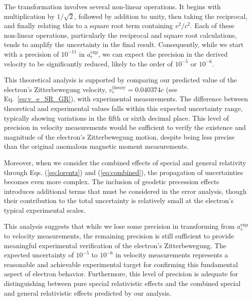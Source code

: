 \documentclass[%
 reprint,
 amsmath,amssymb,
 aps,
]{revtex4-1}
\numberwithin{equation}{section}%
\begin{document}
The transformation involves several non-linear operations. It begins with multiplication by $1/\sqrt{2}$, followed by addition to unity, then taking the reciprocal, and finally relating this to a square root term containing $v^2/c^2$. Each of these non-linear operations, particularly the reciprocal and square root calculations, tends to amplify the uncertainty in the final result. Consequently, while we start with a precision of $10^{-11}$ in $a_e^{\text{exp}}$, we can expect the precision in the derived velocity to be significantly reduced, likely to the order of $10^{-5}$ or $10^{-6}$.

This theoretical analysis is supported by comparing our predicted value of the electron's Zitterbewegung velocity, $v_e^{\text{theory}} = 0.040374c$ (see Eq.~\ref{eq:v_e_SR_GR}), with experimental measurements. The difference between theoretical and experimental values falls within this expected uncertainty range, typically showing variations in the fifth or sixth decimal place. This level of precision in velocity measurements would be sufficient to verify the existence and magnitude of the electron's Zitterbewegung motion, despite being less precise than the original anomalous magnetic moment measurements.

Moreover, when we consider the combined effects of special and general relativity through Eqs. (\ref{eq:lorentz}) and (\ref{eq:combined}), the propagation of uncertainties becomes even more complex. The inclusion of geodetic precession effects introduces additional terms that must be considered in the error analysis, though their contribution to the total uncertainty is relatively small at the electron's typical experimental scales.

This analysis suggests that while we lose some precision in transforming from $a_e^{\text{exp}}$ to velocity measurements, the remaining precision is still sufficient to provide meaningful experimental verification of the electron's Zitterbewegung. The expected uncertainty of $10^{-5}$ to $10^{-6}$ in velocity measurements represents a reasonable and achievable experimental target for confirming this fundamental aspect of electron behavior. Furthermore, this level of precision is adequate for distinguishing between pure special relativistic effects and the combined special and general relativistic effects predicted by our analysis.
\end{document}
